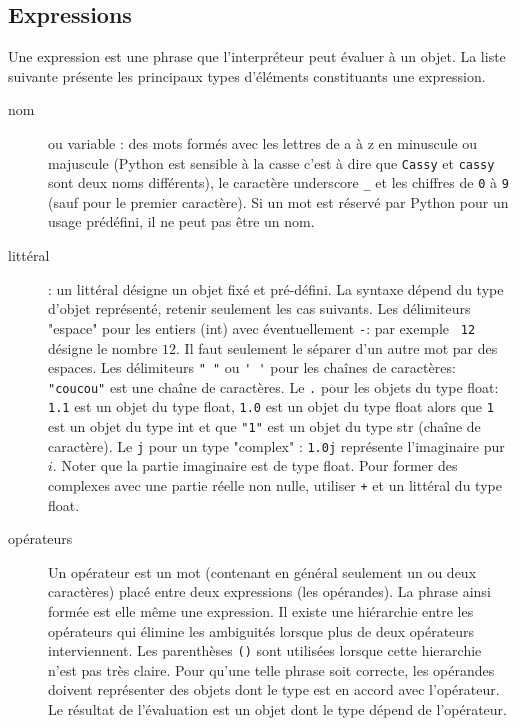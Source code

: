 \subsection{Expressions}
Une expression est une phrase que l'interpréteur peut évaluer à un objet. La liste suivante présente les principaux types d'éléments constituants une expression.
\begin{description}
 \item[nom] ou variable : des mots formés avec les lettres de a à z en minuscule ou majuscule (Python est sensible à la casse c'est à dire que \verb|Cassy| et \verb|cassy| sont deux noms différents), le caractère underscore \verb|_| et les chiffres de \verb|0| à \verb|9| (sauf pour le premier caractère). Si un mot est réservé par Python pour un usage prédéfini, il ne peut pas être un nom.
 \item[littéral] :  un littéral désigne un objet fixé et pré-défini. La syntaxe dépend du type d'objet représenté, retenir seulement les cas suivants.\newline
Les délimiteurs "espace" pour les entiers (int) avec éventuellement \verb|-|: par exemple \verb| 12 | désigne le nombre $12$. Il faut seulement le séparer d'un autre mot par des espaces.\newline
Les délimiteurs \verb|" "| ou \verb|' '| pour les chaînes de caractères: \verb|"coucou"| est une chaîne de caractères.\newline
Le \verb|.| pour les objets du type float: \verb|1.1| est un objet du type float, \verb|1.0| est un objet du type float alors que \verb|1| est un objet du type int et que \verb|"1"| est un objet du type str (chaîne de caractère).\newline
Le \verb|j| pour un type "complex" : \verb|1.0j| représente l'imaginaire pur $i$. Noter que la partie imaginaire est de type float. Pour former des complexes avec une partie réelle non nulle, utiliser \verb|+| et un littéral du type float.

\item[opérateurs]  Un opérateur est un mot (contenant en général seulement un ou deux caractères) placé entre deux expressions (les opérandes). La phrase ainsi formée est elle même une expression. Il existe une hiérarchie entre les opérateurs qui élimine les ambiguités lorsque plus de deux opérateurs interviennent. Les parenthèses \verb|()| sont utilisées lorsque cette hierarchie n'est pas très claire. Pour qu'une telle phrase soit correcte, les opérandes doivent représenter des objets dont le type est en accord avec l'opérateur. Le résultat de l'évaluation est un objet dont le type dépend de l'opérateur.  
\end{description}
